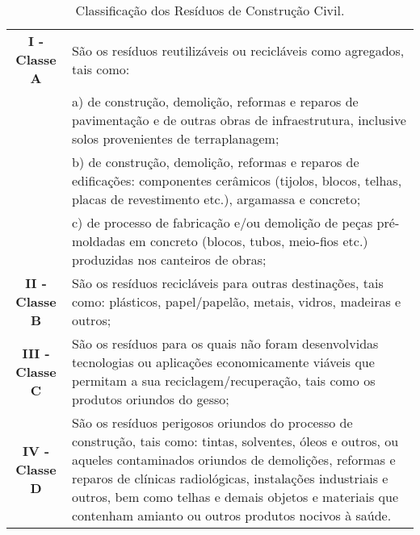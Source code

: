 \begin{table}[htbp]
  \centering
  \caption{Classificação dos Resíduos de Construção Civil.}
    \begin{tabular}{c|p{8cm}}
    \rowcolor[rgb]{ .984,  .831,  .706} \textbf{I - Classe A} & São os resíduos reutilizáveis ou recicláveis como agregados, tais como:  \\
    \rowcolor[rgb]{ .984,  .831,  .706}       & a) de construção, demolição, reformas e reparos de pavimentação e de outras obras de infraestrutura, inclusive solos provenientes de terraplanagem; \\
    \rowcolor[rgb]{ .984,  .831,  .706}       & b) de construção, demolição, reformas e reparos de edificações: componentes cerâmicos (tijolos, blocos, telhas, placas de revestimento etc.), argamassa e concreto;  \\
    \rowcolor[rgb]{ .984,  .831,  .706}       & c) de processo de fabricação e/ou demolição de peças pré-moldadas em concreto (blocos, tubos, meio-fios etc.) produzidas nos canteiros de obras;  \\
    \rowcolor[rgb]{ .992,  .914,  .851} \textbf{II - Classe B} & São os resíduos recicláveis para outras destinações, tais como: plásticos, papel/papelão, metais, vidros, madeiras e outros;  \\
    \rowcolor[rgb]{ .984,  .831,  .706} \textbf{III - Classe C} & São os resíduos para os quais não foram desenvolvidas tecnologias ou aplicações economicamente viáveis que permitam a sua reciclagem/recuperação, tais como os produtos oriundos do gesso;  \\
    \rowcolor[rgb]{ .992,  .914,  .851} \textbf{IV - Classe D} & São os resíduos perigosos oriundos do processo de construção, tais como: tintas, solventes, óleos e outros, ou aqueles contaminados oriundos de demolições, reformas e reparos de clínicas radiológicas, instalações industriais e outros, bem como telhas e demais objetos e materiais que contenham amianto ou outros produtos nocivos à saúde. \\
    \end{tabular}%
  \label{tab:classificacao_rcc}%
\end{table}%
